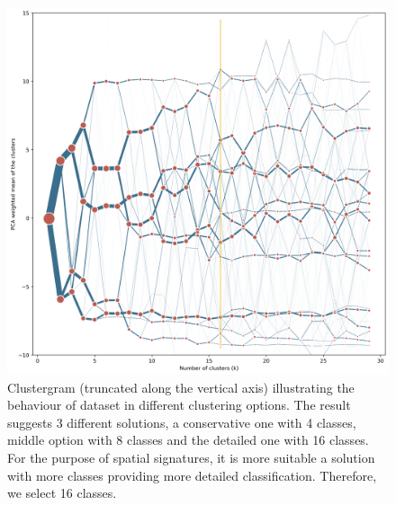 \begin{figure}
    \includegraphics[width=\linewidth]{figures/clustergram_des.png}
    \caption{Clustergram (truncated along the vertical axis) illustrating the behaviour
    of dataset in different clustering options. The result suggests 3 different
    solutions, a conservative one with 4 classes, middle option with 8 classes
    and the detailed one with 16 classes. For the purpose of spatial signatures, it is
    more suitable a solution with more classes providing more detailed classification.
    Therefore, we select 16 classes.}
    \label{fig:cgram_des}
\end{figure}

